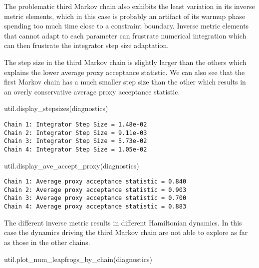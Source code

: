 \documentclass[
  letterpaper,
  DIV=11,
  numbers=noendperiod]{scrartcl}
\newenvironment{Shaded}{\begin{snugshade}}{\end{snugshade}}
\newcommand{\NormalTok}[1]{\textcolor[rgb]{0.00,0.23,0.31}{#1}}
\begin{document}
The problematic third Markov chain also exhibits the least variation in
its inverse metric elements, which in this case is probably an artifact
of its warmup phase spending too much time close to a constraint
boundary. Inverse metric elements that cannot adapt to each parameter
can frustrate numerical integration which can then frustrate the
integrator step size adaptation.

The step size in the third Markov chain is slightly larger than the
others which explains the lower average proxy acceptance statistic. We
can also see that the first Markov chain has a much smaller step size
than the other which results in an overly conservative average proxy
acceptance statistic.

\begin{Shaded}
\begin{Highlighting}[]
\NormalTok{util.display\_stepsizes(diagnostics)}
\end{Highlighting}
\end{Shaded}

\begin{verbatim}
Chain 1: Integrator Step Size = 1.48e-02
Chain 2: Integrator Step Size = 9.11e-03
Chain 3: Integrator Step Size = 5.73e-02
Chain 4: Integrator Step Size = 1.05e-02
\end{verbatim}

\begin{Shaded}
\begin{Highlighting}[]
\NormalTok{util.display\_ave\_accept\_proxy(diagnostics)}
\end{Highlighting}
\end{Shaded}

\begin{verbatim}
Chain 1: Average proxy acceptance statistic = 0.840
Chain 2: Average proxy acceptance statistic = 0.903
Chain 3: Average proxy acceptance statistic = 0.700
Chain 4: Average proxy acceptance statistic = 0.883
\end{verbatim}

The different inverse metric results in different Hamiltonian dynamics.
In this case the dynamics driving the third Markov chain are not able to
explore as far as those in the other chains.

\begin{Shaded}
\begin{Highlighting}[]
\NormalTok{util.plot\_num\_leapfrogs\_by\_chain(diagnostics)}
\end{Highlighting}
\end{Shaded}
\end{document}
